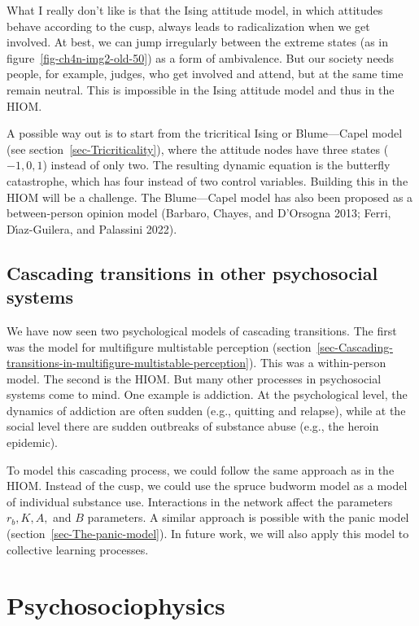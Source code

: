 \documentclass[
  a4paper,
  DIV=11,
  numbers=noendperiod,
  oneside]{scrreprt}
\begin{document}
What I really don't like is that the Ising attitude model, in which
attitudes behave according to the cusp, always leads to radicalization
when we get involved. At best, we can jump irregularly between the
extreme states (as in figure~\ref{fig-ch4n-img2-old-50}) as a form of
ambivalence. But our society needs people, for example, judges, who get
involved and attend, but at the same time remain neutral. This is
impossible in the Ising attitude model and thus in the HIOM.

A possible way out is to start from the tricritical Ising or
Blume---Capel model (see section~\ref{sec-Tricriticality}), where the
attitude nodes have three states (\(-1, 0, 1\)) instead of only two. The
resulting dynamic equation is the butterfly catastrophe, which has four
instead of two control variables. Building this in the HIOM will be a
challenge. The Blume---Capel model has also been proposed as a
between-person opinion model (Barbaro, Chayes, and D'Orsogna 2013;
Ferri, Dı́az-Guilera, and Palassini 2022).

\subsection{Cascading transitions in other psychosocial
systems}\label{sec-Cascading-transitions-in-other-psychosocial-systems}

We have now seen two psychological models of cascading transitions. The
first was the model for multifigure multistable perception
(section~\ref{sec-Cascading-transitions-in-multifigure-multistable-perception}).
This was a within-person model. The second is the HIOM. But many other
processes in psychosocial systems come to mind. One example is
addiction. At the psychological level, the dynamics of addiction are
often sudden (e.g., quitting and relapse), while at the social level
there are sudden outbreaks of substance abuse (e.g., the heroin
epidemic).

To model this cascading process, we could follow the same approach as in
the HIOM. Instead of the cusp, we could use the spruce budworm model as
a model of individual substance use. Interactions in the network affect
the parameters \(r_{b}, K, A,\) and \(B\) parameters. A similar approach
is possible with the panic model (section~\ref{sec-The-panic-model}). In
future work, we will also apply this model to collective learning
processes.

\section{Psychosociophysics}\label{sec-Psychosociophysics}
\end{document}

